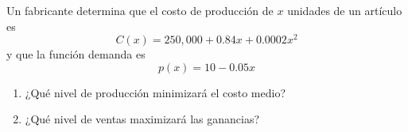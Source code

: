 \item Un fabricante determina que el costo de producción de $x$ unidades de un artículo es
$$C(x) = 250,000 + 0.84x + 0.0002x^2$$
y que la función demanda es
$$p(x) = 10 - 0.05x$$
\begin{enumerate}
    \item[(a)] ¿Qué nivel de producción minimizará el costo medio?
    \item[(b)] ¿Qué nivel de ventas maximizará las ganancias?
\end{enumerate}
